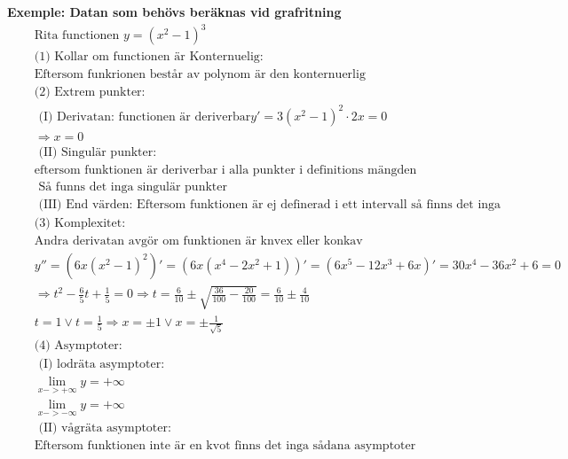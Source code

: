 \textbf{Exemple: Datan som behövs beräknas vid grafritning}
\begin{align*}
  &\quad  \text{Rita functionen } y={(x^2-1)}^3 \\
  &\quad  \text{(1) Kollar om functionen är Konternuelig:} \\
  &\quad  \text{Eftersom funkrionen består av polynom är den konternuerlig}   \\
  &\quad  \text{(2) Extrem punkter: }   \\
  &\quad  \text{ (I) Derivatan: functionen är deriverbar} y'=3{(x^2-1)}^2 \cdot 2x=0 \\
  &\quad  \Rightarrow x=0  \\
  &\quad  \text{ (II) Singulär punkter:} \\
  &\quad  \text{eftersom funktionen är deriverbar i alla punkter i definitions mängden } \\
  &\quad  \text{ Så funns det inga singulär punkter} \\
  &\quad  \text{ (III) End värden: Eftersom funktionen är ej definerad i ett intervall så finns det inga } \\
  &\quad  \text{(3) Komplexitet: } \\
  &\quad  \text{Andra derivatan avgör om funktionen är knvex eller konkav} \\
  &\quad  y''=(6x{(x^2-1)}^2)'= (6x{(x^4-2x^2+1)})' = (6x^5-12x^3+6x)' = 30x^4-36x^2+6 = 0 \\
  &\quad  \Rightarrow t^2-\frac{6}{5}t+\frac{1}{5}=0 \Rightarrow t=\frac{6}{10}\pm
  \sqrt{\frac{36}{100}-\frac{20}{100}} = \frac{6}{10} \pm \frac{4}{10}  \\
  &\quad  t=1 \lor t=\frac{1}{5} \Rightarrow x=\pm1 \lor x=\pm\frac{1}{\sqrt{5}}  \\
  &\quad  \text{(4) Asymptoter: } \\
  &\quad  \text{ (I) lodräta asymptoter: }  \\
  &\quad  \lim_{x->+\infty}y=+\infty \\
  &\quad  \lim_{x->-\infty}y=+\infty \\
  &\quad  \text{ (II) vågräta asymptoter:} \\
  &\quad  \text{Eftersom funktionen inte är en kvot finns det inga sådana asymptoter }  \\
\end{align*}
